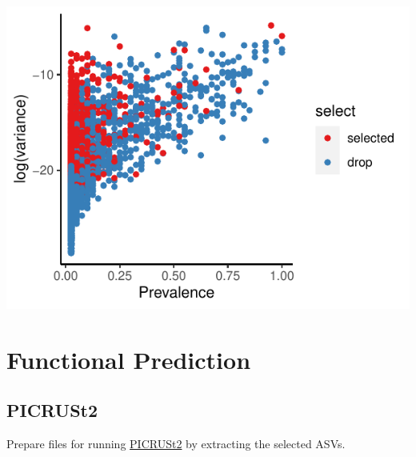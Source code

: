 \documentclass[
]{article}
\begin{document}
\includegraphics{workshop_files/figure-latex/unnamed-chunk-51-6.pdf}

\hypertarget{functional-prediction}{%
\section{Functional Prediction}\label{functional-prediction}}

\hypertarget{picrust2}{%
\subsection{PICRUSt2}\label{picrust2}}

Prepare files for running
\href{https://huttenhower.sph.harvard.edu/picrust/}{PICRUSt2} by
extracting the selected ASVs.
\end{document}
